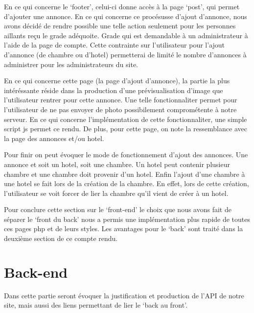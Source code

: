 \documentclass[12pt]{article}
\begin{document}
    \vphantom{}

    En ce qui concerne le `footer', celui-ci donne accès à la page `post', qui 
    permet d'ajouter une annonce. En ce qui concerne ce procésusse d'ajout 
    d'annonce, nous avons décidé de rendre possible une telle action seulement
    pour les personnes aillants reçu le grade adéquoite. Grade qui est 
    demandable à un administrateur à l'aide de la page de compte. Cette 
    contrainte sur l'utilisateur pour l'ajout d'annonce (de chambre ou d'hotel) 
    permetterai de limité le nombre d'annonces à administrer pour les 
    administrateurs du site.
    
    \vphantom{}
    
    En ce qui concerne cette page (la page d'ajout d'annonce), la partie la plus 
    intéréssante réside dans la production d'une prévisualisation d'image que 
    l'utilisateur rentrer pour cette annonce. Une telle fonctionnaliter permet 
    pour l'utilisateur de ne pas envoyer de photo possibilement comprométente à 
    notre serveur. En ce qui concerne l'implémentation de cette fonctionnaliter, 
    une simple script js permet ce rendu. De plus, pour cette page, on note la 
    ressemblance avec la page des annonces et/ou hotel. 

    \vphantom{}

    Pour finir on peut évoquer le mode de fonctionnement d'ajout des annonces. 
    Une annonce et soit un hotel, soit une chambre. Un hotel peut contenir 
    plusieur chambre et une chambre doit provenir d'un hotel. Enfin l'ajout 
    d'une chambre à une hotel se fait lors de la création de la chambre. 
    En effet, lors de cette création, l'utilisateur se voit forcer de lier la 
    chambre qu'il vient de créer à un hotel.

    \vphantom{}
    
    Pour conclure cette section sur le `front-end' le choix que nous avons fait 
    de séparer le `front du back' nous a permis une implémentation plus rapide 
    de toutes ces pages php et de leurs styles. Les avantages pour le `back' 
    sont traité dans la deuxième section de ce compte rendu. 

    \newpage

    \section{Back-end}

    Dans cette partie seront évoquer la justification et production de l'API de 
    notre site, mais aussi des liens permettant de lier le `back au front'.
\end{document}
